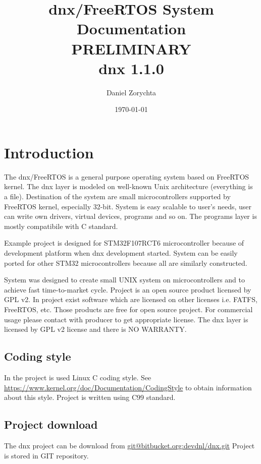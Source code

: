 \documentclass[a4paper,11pt]{report}
\title{dnx/FreeRTOS System Documentation\\[1em]PRELIMINARY\\[1em]dnx 1.1.0}
\author{Daniel Zorychta}
\date{\today}
\begin{document}
\maketitle
\tableofcontents


\chapter{Introduction}
The dnx/FreeRTOS is a general purpose operating system based on FreeRTOS kernel.
The dnx layer is modeled on well-known Unix architecture (everything is a file).
Destination  of  the  system  are  small  microcontrollers supported by FreeRTOS
kernel,  especially  32-bit.  System  is easy scalable to user's needs, user can
write own drivers,  virtual devices,  programs and so on.  The programs layer is
mostly compatibile with C standard.

Example project is designed for STM32F107RCT6 microcontroller because of development platform when
dnx development started. System can be easily ported for other STM32 microcontrollers because all
are similarly constructed.

System was designed to create small UNIX system on microcontrollers and to achieve fast
time-to-market cycle. Project is an open source product licensed by GPL v2. In project exist
software which are licensed on other licenses i.e. FATFS, FreeRTOS, etc. Those products are free
for open source project. For commercial usage please contact with producer to get appropriate
license. The dnx layer is licensed by GPL v2 license and there is NO WARRANTY.

\section{Coding style}
In the project is used Linux C coding style.
See \url{https://www.kernel.org/doc/Documentation/CodingStyle} to obtain information about
this style. Project is written using C99 standard.

\section{Project download}
The dnx project can be download from \url{git@bitbucket.org:devdnl/dnx.git}
Project is stored in GIT repository.

\end{document}
